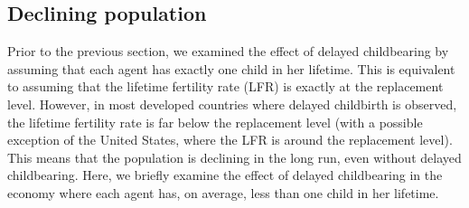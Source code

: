 \documentclass[nogrid]{MBE}%
\begin{document}
{\subsection{Declining population}

Prior to the previous section, we examined the effect of delayed childbearing
by assuming that each agent has exactly one child in her lifetime. This is
equivalent to assuming that the lifetime fertility rate (LFR) is exactly at
the replacement level. However, in most developed countries where delayed
childbirth is observed, the lifetime fertility rate is far below the
replacement level (with a possible exception of the United States, where the
LFR is around the replacement level). This means that the population is
declining in the long run, even without delayed childbearing. Here, we briefly
examine the effect of delayed childbearing in the economy where each agent
has, on average, less than one child in her lifetime.




}
\end{document}
